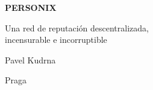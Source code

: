 \thispagestyle{empty}
\begin{center}
  {\sffamily\bfseries\fontsize{34}{40}\selectfont PERSONIX\par}
  \vspace{2.2em}
  {\rmfamily\large Una red de reputación descentralizada,\\[0.25em]
   incensurable e incorruptible\par}
\end{center}
\begin{center}
  {\rmfamily\Large Pavel Kudrna\par}
  \vspace{0.45em}
  {\rmfamily\small Praga\quad\textbullet{}\par}
\end{center}
\clearpage
